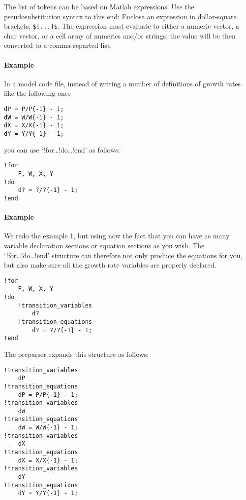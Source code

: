 The list of tokens can be based on Matlab expressions. Use the
\href{modellang/pseudosubs}{pseudosubstitution} syntax to this end:
Enclose an expression in dollar-square brackets, \texttt{\${[}...{]}\$}.
The expression must evaluate to either a numeric vector, a char vector,
or a cell array of numerics and/or strings; the value will be then
converted to a comma-separted list.

\paragraph{Example}\label{example}

In a model code file, instead of writing a number of definitions of
growth rates like the following ones

\begin{verbatim}
dP = P/P{-1} - 1;
dW = W/W{-1} - 1;
dX = X/X{-1} - 1;
dY = Y/Y{-1} - 1;
\end{verbatim}

you can use `!for\ldots{}!do\ldots{}!end' as follows:

\begin{verbatim}
!for
    P, W, X, Y
!do
    d? = ?/?{-1} - 1;
!end
\end{verbatim}

\paragraph{Example}\label{example-1}

We redo the example 1, but using now the fact that you can have as many
variable declaration sections or equation sections as you wish. The
`!for\ldots{}!do\ldots{}!end' structure can therefore not only produce
the equations for you, but also make sure all the growth rate variables
are properly declared.

\begin{verbatim}
!for
    P, W, X, Y
!do
    !transition_variables
        d?
    !transition_equations
        d? = ?/?{-1} - 1;
!end
\end{verbatim}

The preparser expands this structure as follows:

\begin{verbatim}
!transition_variables
    dP
!transition_equations
    dP = P/P{-1} - 1;
!transition_variables
    dW
!transition_equations
    dW = W/W{-1} - 1;
!transition_variables
    dX
!transition_equations
    dX = X/X{-1} - 1;
!transition_variables
    dY
!transition_equations
    dY = Y/Y{-1} - 1;
\end{verbatim}

